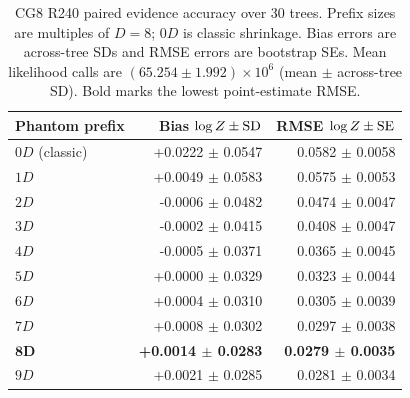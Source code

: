 \begin{table}[t]
\caption{CG8 R240 paired evidence accuracy over 30 trees. Prefix sizes are multiples of $D=8$; $0D$ is classic shrinkage. Bias errors are across-tree SDs and RMSE errors are bootstrap SEs. Mean likelihood calls are $(65.254\pm1.992)\times10^6$ (mean $\pm$ across-tree SD). Bold marks the lowest point-estimate RMSE.}
\label{tab:phantom_evidence_cg8}
\centering
\scriptsize
\begin{tabular}{lrr}
\toprule
Phantom prefix & Bias $\log Z\mathbin{\pm}{\rm SD}$ & RMSE $\log Z\mathbin{\pm}{\rm SE}$ \\
\midrule
$0D$ (classic) & +0.0222 $\pm$ 0.0547 & 0.0582 $\pm$ 0.0058 \\
$1D$ & +0.0049 $\pm$ 0.0583 & 0.0575 $\pm$ 0.0053 \\
$2D$ & -0.0006 $\pm$ 0.0482 & 0.0474 $\pm$ 0.0047 \\
$3D$ & -0.0002 $\pm$ 0.0415 & 0.0408 $\pm$ 0.0047 \\
$4D$ & -0.0005 $\pm$ 0.0371 & 0.0365 $\pm$ 0.0045 \\
$5D$ & +0.0000 $\pm$ 0.0329 & 0.0323 $\pm$ 0.0044 \\
$6D$ & +0.0004 $\pm$ 0.0310 & 0.0305 $\pm$ 0.0039 \\
$7D$ & +0.0008 $\pm$ 0.0302 & 0.0297 $\pm$ 0.0038 \\
$\boldsymbol{8D}$ & \textbf{+0.0014 $\pm$ 0.0283} & \textbf{0.0279 $\pm$ 0.0035} \\
$9D$ & +0.0021 $\pm$ 0.0285 & 0.0281 $\pm$ 0.0034 \\
\bottomrule
\end{tabular}
\end{table}

